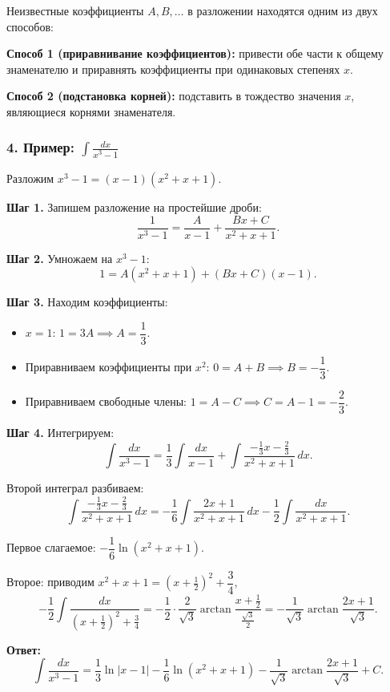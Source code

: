 Неизвестные коэффициенты $A, B, \ldots$ в разложении находятся одним из двух способов:

\textbf{Способ 1 (приравнивание коэффициентов):} привести обе части к общему знаменателю и приравнять коэффициенты при одинаковых степенях $x$.

\textbf{Способ 2 (подстановка корней):} подставить в тождество значения $x$, являющиеся корнями знаменателя.

\subsubsection*{4. Пример: $\displaystyle\int \frac{dx}{x^3-1}$}

Разложим $x^3-1 = (x-1)(x^2+x+1)$.

\textbf{Шаг 1.} Запишем разложение на простейшие дроби:
\[
\frac{1}{x^3-1} = \frac{A}{x-1} + \frac{Bx+C}{x^2+x+1}.
\]

\textbf{Шаг 2.} Умножаем на $x^3-1$:
\[
1 = A(x^2+x+1) + (Bx+C)(x-1).
\]

\textbf{Шаг 3.} Находим коэффициенты:
\begin{itemize}
    \item $x=1$: $1 = 3A \implies A = \dfrac{1}{3}$.
    \item Приравниваем коэффициенты при $x^2$: $0 = A+B \implies B = -\dfrac{1}{3}$.
    \item Приравниваем свободные члены: $1 = A - C \implies C = A-1 = -\dfrac{2}{3}$.
\end{itemize}

\textbf{Шаг 4.} Интегрируем:
\[
\int \frac{dx}{x^3-1}
= \frac{1}{3}\int\frac{dx}{x-1}
+ \int\frac{-\tfrac{1}{3}x - \tfrac{2}{3}}{x^2+x+1}\,dx.
\]

Второй интеграл разбиваем:
\[
\int\frac{-\tfrac{1}{3}x-\tfrac{2}{3}}{x^2+x+1}\,dx
= -\frac{1}{6}\int\frac{2x+1}{x^2+x+1}\,dx
- \frac{1}{2}\int\frac{dx}{x^2+x+1}.
\]

Первое слагаемое: $-\dfrac{1}{6}\ln(x^2+x+1)$.

Второе: приводим $x^2+x+1 = \left(x+\tfrac{1}{2}\right)^2 + \dfrac{3}{4}$,
\[
-\frac{1}{2}\int\frac{dx}{\left(x+\frac{1}{2}\right)^2+\frac{3}{4}}
= -\frac{1}{2}\cdot\frac{2}{\sqrt{3}}\arctan\frac{x+\frac{1}{2}}{\frac{\sqrt{3}}{2}}
= -\frac{1}{\sqrt{3}}\arctan\frac{2x+1}{\sqrt{3}}.
\]

\textbf{Ответ:}
\[
\boxed{
\int\frac{dx}{x^3-1}
= \frac{1}{3}\ln|x-1|
- \frac{1}{6}\ln(x^2+x+1)
- \frac{1}{\sqrt{3}}\arctan\frac{2x+1}{\sqrt{3}} + C.
}
\]